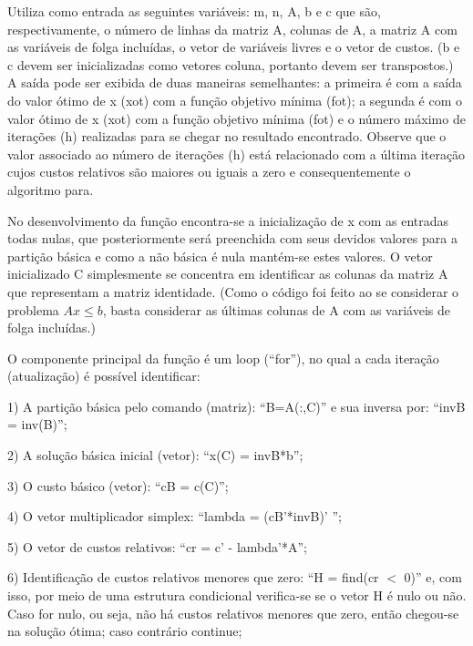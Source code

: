 \documentclass[10pt]{article}
\begin{document}
Utiliza como entrada as seguintes variáveis: m, n, A, b e c que são, respectivamente, o número de linhas da matriz A, colunas de A, a matriz A com as variáveis de folga incluídas, o vetor de variáveis livres e o vetor de custos. (b e c devem ser inicializadas como vetores coluna, portanto devem ser transpostos.) A saída pode ser exibida de duas maneiras semelhantes: a primeira é com a saída do valor ótimo de x (xot) com a função objetivo mínima (fot); a segunda é com o valor ótimo de x (xot) com a função objetivo mínima (fot) e o número máximo de iterações (h) realizadas para se chegar no resultado encontrado. Observe que o valor associado ao número de iterações (h) está relacionado com a última iteração cujos custos relativos são maiores ou iguais a zero e consequentemente o algoritmo para.
\newline

No desenvolvimento da função encontra-se a inicialização de x com as entradas todas nulas, que posteriormente será preenchida com seus devidos valores para a partição básica e como a não básica é nula mantém-se estes valores. O vetor inicializado C simplesmente se concentra em identificar as colunas da matriz A que representam a matriz identidade. (Como o código foi feito ao se considerar o problema $Ax \le b$, basta considerar as últimas colunas de A com as variáveis de folga incluídas.)
\newline

O componente principal da função é um loop (``for''), no qual a cada iteração (atualização) é possível identificar:
\newline

1) A partição básica pelo comando (matriz): ``B=A(:,C)'' e sua inversa por: ``invB = inv(B)'';
\newline

2) A solução básica inicial (vetor): ``x(C) = invB*b'';
\newline

3) O custo básico (vetor): ``cB = c(C)'';
\newline

4) O vetor multiplicador simplex: ``lambda = (cB'*invB)' '';
\newline

5) O vetor de custos relativos: ``cr = c' - lambda'*A'';
\newline

6) Identificação de custos relativos menores que zero: ``H = find(cr $<$ 0)'' e, com isso, por meio de uma estrutura condicional verifica-se se o vetor H é nulo ou não. Caso for nulo, ou seja, não há custos relativos menores que zero, então chegou-se na solução ótima; caso contrário continue;
\newline
\end{document}
